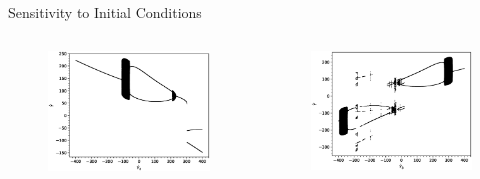 \documentclass{beamer}
\begin{document}
\begin{frame}{Sensitivity to Initial Conditions}
	\begin{columns}
	\begin{column}{0.5\textwidth}
		\begin{figure}
			\centering
			\includegraphics[width=1.2\textwidth]{y2bifurcation.eps}
		\end{figure}
	\end{column}
	\begin{column}{0.5\textwidth}
		\begin{figure}
			\centering
			\includegraphics[width=1.2\textwidth]{y3bifurcation.eps}
		\end{figure}
	\end{column}
	\end{columns}
\end{frame}
\end{document}
